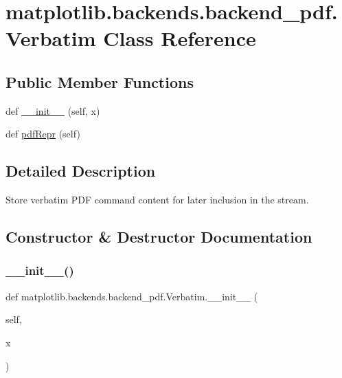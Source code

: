 \hypertarget{classmatplotlib_1_1backends_1_1backend__pdf_1_1Verbatim}{}\section{matplotlib.\+backends.\+backend\+\_\+pdf.\+Verbatim Class Reference}
\label{classmatplotlib_1_1backends_1_1backend__pdf_1_1Verbatim}
\subsection*{Public Member Functions}
\begin{DoxyCompactItemize}
\item 
def \hyperlink{classmatplotlib_1_1backends_1_1backend__pdf_1_1Verbatim_a3287d8b7591e0b74d9a9d2db9bd34a80}{\+\_\+\+\_\+init\+\_\+\+\_\+} (self, x)
\item 
def \hyperlink{classmatplotlib_1_1backends_1_1backend__pdf_1_1Verbatim_a62235e6e70153217b339406ee45967a7}{pdf\+Repr} (self)
\end{DoxyCompactItemize}


\subsection{Detailed Description}
\begin{DoxyVerb}Store verbatim PDF command content for later inclusion in the stream.\end{DoxyVerb}
 

\subsection{Constructor \& Destructor Documentation}
\mbox{\label{classmatplotlib_1_1backends_1_1backend__pdf_1_1Verbatim_a3287d8b7591e0b74d9a9d2db9bd34a80}} 
\subsubsection{\texorpdfstring{\+\_\+\+\_\+init\+\_\+\+\_\+()}{\_\_init\_\_()}}
{\footnotesize\ttfamily def matplotlib.\+backends.\+backend\+\_\+pdf.\+Verbatim.\+\_\+\+\_\+init\+\_\+\+\_\+ (\begin{DoxyParamCaption}\item[{}]{self,  }\item[{}]{x }\end{DoxyParamCaption})}



